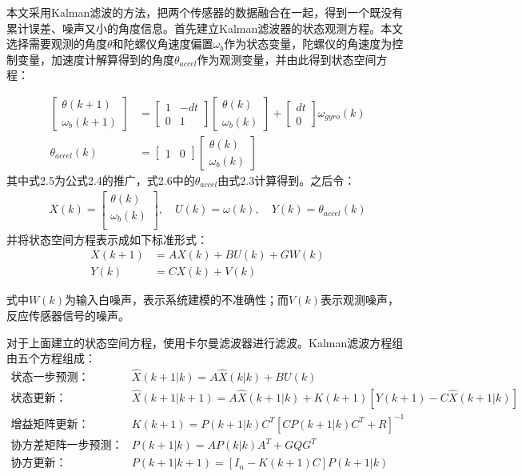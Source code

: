 本文采用Kalman滤波的方法，把两个传感器的数据融合在一起，得到一个既没有累计误差、噪声又小的角度信息。首先建立Kalman滤波器的状态观测方程。本文选择需要观测的角度$\theta$和陀螺仪角速度偏置$\omega_b$作为状态变量，陀螺仪的角速度为控制变量，加速度计解算得到的角度$\theta_{accel}$作为观测变量，并由此得到状态空间方程：

\begin{align}
\begin{bmatrix} \theta(k+1)  \\ \omega_b(k+1)   \end{bmatrix} &= \begin{bmatrix} 1 & -dt \\ 0 & 1   \end{bmatrix}\begin{bmatrix} \theta(k)  \\ \omega_b(k) \end{bmatrix} + \begin{bmatrix} dt \\ 0  \end{bmatrix} \omega_{gyro}(k) \\
\theta_{accel}(k) &=\begin{bmatrix} 1 & 0  \end{bmatrix}  \begin{bmatrix} \theta(k) \\ \omega_b(k)  \end{bmatrix}
\end{align}
其中式2.5为公式2.4的推广，式2.6中的$\theta_{accel}$由式2.3计算得到。之后令：
\begin{align}
X(k) = \begin{bmatrix} \theta(k)  \\ \omega_{b}(k) \\  \end{bmatrix}, \quad U(k) = \omega(k), \quad Y(k) = \theta_{accel}(k)
\end{align}
并将状态空间方程表示成如下标准形式：
\begin{align}
X(k+1) &= A X(k) + B U(k) + G W(k) \\
Y(k) &= C X(k) + V(k)
\end{align}

式中$W(k)$为输入白噪声，表示系统建模的不准确性；而$V(k)$表示观测噪声，反应传感器信号的噪声。

对于上面建立的状态空间方程，使用卡尔曼滤波器\cite{p50}进行滤波。Kalman滤波方程组由五个方程组成：
\begin{align}
    状态一步预测： & \hat{X}(k+1|k) = A \hat{X}(k|k) + B U(k) \\
    状态更新：& \hat{X}(k+1|k+1) = A \hat{X}(k+1|k) + K(k+1)[Y(k+1)-C\hat{X}(k+1|k)] \\
    增益矩阵更新：& K(k+1) = P(k+1|k)C^T[CP(k+1|k)C^T + R]^{-1} \\
    协方差矩阵一步预测：& P(k+1|k) = AP(k|k)A^T+GQG^T \\
    协方更新：& P(k+1|k+1) = [I_n-K(k+1)C]P(k+1|k)
\end{align}

